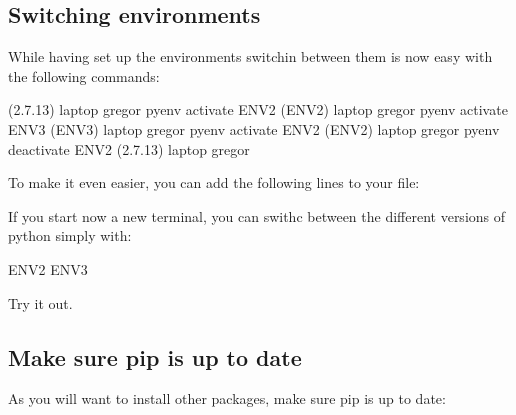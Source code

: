 \subsection{Switching environments}
\label{\detokenize{lesson/prg/pyenv:switching-environments}}
While having set up the environments switchin between them is now easy
with the following commands:

\begin{sphinxVerbatim}[commandchars=\\\{\}]
(2.7.13) laptop\PYGZti{} gregor\PYGZdl{} pyenv activate ENV2
(ENV2) laptop\PYGZti{} gregor\PYGZdl{} pyenv activate ENV3
(ENV3) laptop\PYGZti{} gregor\PYGZdl{} pyenv activate ENV2
(ENV2) laptop\PYGZti{} gregor\PYGZdl{} pyenv deactivate ENV2
(2.7.13) laptop\PYGZti{} gregor\PYGZdl{}
\end{sphinxVerbatim}

To make it even easier, you can add the following lines to your 
file:

\begin{sphinxVerbatim}[commandchars=\\\{\}]
 
 
\end{sphinxVerbatim}

If you start now a new terminal, you can swithc between the different
versions of python simply with:

\begin{sphinxVerbatim}[commandchars=\\\{\}]
\PYGZdl{} ENV2
\PYGZdl{} ENV3
\end{sphinxVerbatim}

Try it out.


\subsection{Make sure pip is up to date}
\label{\detokenize{lesson/prg/pyenv:make-sure-pip-is-up-to-date}}
As you will want to install other packages, make sure pip is up to
date:

\begin{sphinxVerbatim}[commandchars=\\\{\}]
   
\end{sphinxVerbatim}



